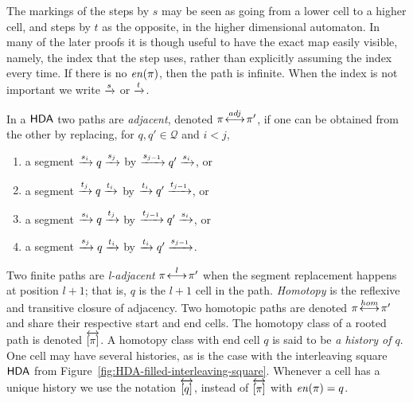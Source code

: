     The markings of the steps by $s$ may be seen as going from a lower cell to a higher cell, and steps by $t$ as the opposite, in the higher dimensional automaton. In many of the later proofs it is though useful to have the exact map easily visible, namely, the index that the step uses, rather than explicitly assuming the index every time. If there is no $\mathit{en}(\pi)$, then the path is infinite. When the index is not important we write $\xrightarrow{s}$ or $\xrightarrow{t}$.
    
    \begin{definition}
    \label{def:histories-for-HDA}
    
        In a $\text{\textup{\textsf{HDA}}}$ two paths are \emph{adjacent}, denoted $\pi\!\stackrel{adj}{\longleftrightarrow}\!\pi'$, if one can be obtained from the other by replacing, for $q,q'\in \mathcal{Q}$ and $i<j$,
        
        \begin{enumerate}
            \item a segment $\xrightarrow{s_{i}}q\xrightarrow{s_{j}}$ by $\xrightarrow{s_{j-1}}q'\xrightarrow{s_{i}}$, or
            \item a segment $\xrightarrow{t_{j}}q\xrightarrow{t_{i}}$ by $\xrightarrow{t_{i}}q'\xrightarrow{t_{j-1}}$, or
            \item a segment $\xrightarrow{s_{i}}q\xrightarrow{t_{j}}$ by $\xrightarrow{t_{j-1}}q'\xrightarrow{s_{i}}$, or
            \item a segment $\xrightarrow{s_{j}}q\xrightarrow{t_{i}}$ by $\xrightarrow{t_{i}}q'\xrightarrow{s_{j-1}}$.
        \end{enumerate}

        Two finite paths are \textit{l-adjacent} $\pi\!\stackrel{l}{\longleftrightarrow}\!\pi'$ when the segment replacement happens at position $l+1$; that is, $q$ is the $l+1$ cell in the path. \emph{Homotopy} is the reflexive and transitive closure of adjacency. Two homotopic paths are denoted $\pi\!\stackrel{hom}{\longleftrightarrow}\!\pi'$ and share their respective start and end cells. The homotopy class of a rooted path is denoted $\overleftrightarrow{[\pi]}$. A homotopy class with end cell $q$ is said to be \emph{a history of $q$}. One cell may have several histories, as is the case with the interleaving square $\text{\textup{\textsf{HDA}}}$ from Figure~\ref{fig:HDA-filled-interleaving-square}. Whenever a cell has a unique history we use the notation $\overleftrightarrow{[q]}$, instead of $\overleftrightarrow{[\pi]}$ with $\mathit{en}(\pi)=q$.
    \end{definition}

